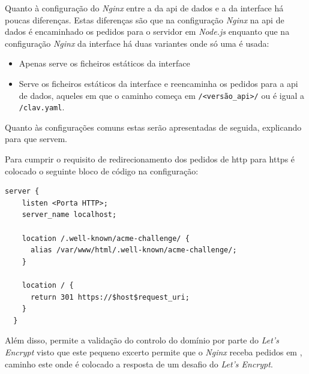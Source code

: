 Quanto à configuração do \textit{Nginx} entre a da \acrshort{api} de dados e a da interface há poucas diferenças. Estas diferenças são que na configuração \textit{Nginx} na \acrshort{api} de dados é encaminhado os pedidos para o servidor em \textit{Node.js} enquanto que na configuração \textit{Nginx} da interface há duas variantes onde só uma é usada:
\begin{itemize}
    \item Apenas serve os ficheiros estáticos da interface
    \item Serve os ficheiros estáticos da interface e reencaminha os pedidos para a \acrshort{api} de dados, aqueles em que o caminho começa em \texttt{/<versão\_api>/} ou é igual a \texttt{/clav.yaml}.
\end{itemize}

Quanto às configurações comuns estas serão apresentadas de seguida, explicando para que servem.

Para cumprir o requisito de redirecionamento dos pedidos de \acrshort{http} para \acrshort{https} é colocado o seguinte bloco de código na configuração:
\begin{lstlisting}[caption=Redirecionamento de \acrshort{http} para \acrshort{https} e validação do domínio na configuração \textit{Nginx}]
  server {
    listen <Porta HTTP>;
    server_name localhost;

    location /.well-known/acme-challenge/ {
      alias /var/www/html/.well-known/acme-challenge/;
    }

    location / {
      return 301 https://$host$request_uri;
    }
  }
\end{lstlisting}
Além disso, permite a validação do controlo do domínio por parte do \textit{Let's Encrypt} visto que este pequeno excerto permite que o \textit{Nginx} receba pedidos em , caminho este onde é colocado a resposta de um desafio do \textit{Let's Encrypt}.

